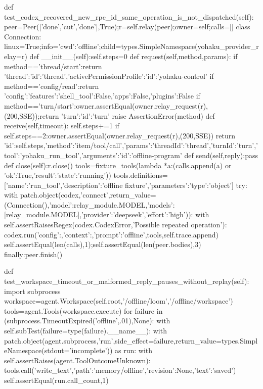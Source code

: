 {    def test_codex_recovered_new_rpc_id_same_operation_is_not_dispatched(self):
        peer=Peer(['done','cut','done'],True);r=self.relay(peer);owner=self;calls=[]
        class Connection:
            linux=True;info={'cwd':'offline'};child=types.SimpleNamespace(yohaku_provider_relay=r)
            def __init__(self):self.steps=0
            def request(self,method,params):
                if method=='thread/start':return {'thread':{'id':'thread'},'activePermissionProfile':{'id':'yohaku-control'}}
                if method=='config/read':return {'config':{'features':{'shell_tool':False,'apps':False,'plugins':False}}}
                if method=='turn/start':owner.assertEqual(owner.relay_request(r),(200,SSE));return {'turn':{'id':'turn'}}
                raise AssertionError(method)
            def receive(self,timeout):
                self.steps+=1
                if self.steps==2:owner.assertEqual(owner.relay_request(r),(200,SSE))
                return {'id':self.steps,'method':'item/tool/call','params':{'threadId':'thread','turnId':'turn','tool':'yohaku_run_tool','arguments':{'id':'offline-program'}}}
            def send(self,reply):pass
            def close(self):r.close()
        tools=fixture_tools(lambda *a:(calls.append(a) or {'ok':True,'result':{'state':'running'}}))
        tools.definitions=[{'name':'run_tool','description':'offline fixture','parameters':{'type':'object'}}]
        try:
            with patch.object(codex,'connect',return_value=(Connection(),{'model':relay_module.MODEL,'models':[relay_module.MODEL],'provider':'deepseek','effort':'high'})):
                with self.assertRaisesRegex(codex.CodexError,'Possible repeated operation'):
                    codex.run({'config':{},'context':{},'prompt':'offline'},tools,self.trace.append)
            self.assertEqual(len(calls),1);self.assertEqual(len(peer.bodies),3)
        finally:peer.finish()

    def test_workspace_timeout_or_malformed_reply_pauses_without_replay(self):
        import subprocess
        workspace=agent.Workspace(self.root,'/offline/loom','/offline/workspace')
        tools=agent.Tools(workspace.execute)
        for failure in (subprocess.TimeoutExpired('offline',.01),None):
            with self.subTest(failure=type(failure).__name__):
                with patch.object(agent.subprocess,'run',side_effect=failure,return_value=types.SimpleNamespace(stdout='incomplete')) as run:
                    with self.assertRaises(agent.ToolOutcomeUnknown):
                        tools.call('write_text',{'path':'memory/offline','revision':None,'text':'saved'})
                    self.assertEqual(run.call_count,1)

}
